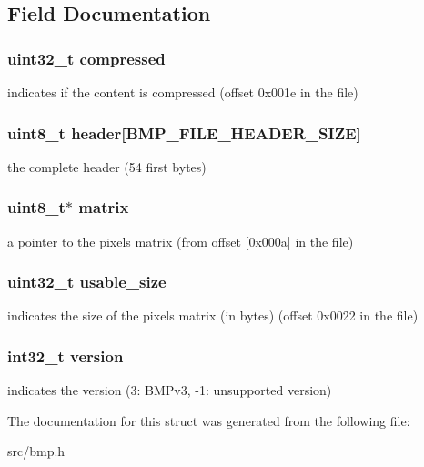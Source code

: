 \subsection{\-Field \-Documentation}
\hypertarget{structbmp__type_ab001ea0e77561ed8d03a29079550a720}{
\subsubsection[{compressed}]{\setlength{\rightskip}{0pt plus 5cm}uint32\-\_\-t {\bf compressed}}}\label{structbmp__type_ab001ea0e77561ed8d03a29079550a720}
indicates if the content is compressed (offset 0x001e in the file) \hypertarget{structbmp__type_a503e04ba6bcc7286467e069ddebd5332}{
\subsubsection[{header}]{\setlength{\rightskip}{0pt plus 5cm}uint8\-\_\-t {\bf header}\mbox{[}\-B\-M\-P\-\_\-\-F\-I\-L\-E\-\_\-\-H\-E\-A\-D\-E\-R\-\_\-\-S\-I\-Z\-E\mbox{]}}}\label{structbmp__type_a503e04ba6bcc7286467e069ddebd5332}
the complete header (54 first bytes) \hypertarget{structbmp__type_a16aac5379a86abf69c6ac771af178866}{
\subsubsection[{matrix}]{\setlength{\rightskip}{0pt plus 5cm}uint8\-\_\-t$\ast$ {\bf matrix}}}\label{structbmp__type_a16aac5379a86abf69c6ac771af178866}
a pointer to the pixels matrix (from offset \mbox{[}0x000a\mbox{]} in the file) \hypertarget{structbmp__type_aadfd1cc69862b81f6c5a3722504fda3c}{
\subsubsection[{usable\-\_\-size}]{\setlength{\rightskip}{0pt plus 5cm}uint32\-\_\-t {\bf usable\-\_\-size}}}\label{structbmp__type_aadfd1cc69862b81f6c5a3722504fda3c}
indicates the size of the pixels matrix (in bytes) (offset 0x0022 in the file) \hypertarget{structbmp__type_a67fae7dd1de9edce3656ed214d20377f}{
\subsubsection[{version}]{\setlength{\rightskip}{0pt plus 5cm}int32\-\_\-t {\bf version}}}\label{structbmp__type_a67fae7dd1de9edce3656ed214d20377f}
indicates the version (3\-: \-B\-M\-Pv3, -\/1\-: unsupported version) 

\-The documentation for this struct was generated from the following file\-:\begin{DoxyCompactItemize}
\item 
src/bmp.\-h\end{DoxyCompactItemize}
